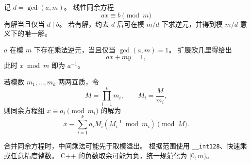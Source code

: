 记 $d=\gcd(a,m)$。
线性同余方程
\[
  ax\equiv b\pmod m
\]
有解当且仅当 $d\mid b$。
若有解，约去 $d$ 后可在模 $m/d$ 下求逆元，并得到模 $m/d$ 意义下的唯一解。

\begin{icpcresult}[逆元存在条件]
  $a$ 在模 $m$ 下存在乘法逆元，当且仅当 $\gcd(a,m)=1$。
  扩展欧几里得给出
  \[
    ax+my=1,
  \]
  此时 $x\bmod m$ 即为 $a^{-1}$。
\end{icpcresult}

若模数 $m_1,\ldots,m_k$ 两两互质，令
\[
  M=\prod_{i=1}^{k}m_i,\qquad M_i=\frac{M}{m_i},
\]
则同余方程组 $x\equiv a_i\pmod{m_i}$ 的解为
\[
  x\equiv \sum_{i=1}^{k}a_iM_i
  \left(M_i^{-1}\bmod m_i\right)\pmod M.
\]

\begin{icpcwarning}[实现细节]
  合并同余方程时，中间乘法可能先于取模溢出。
  根据范围使用 \texttt{\_\_int128}、快速乘或任意精度整数。
  C++ 的负数取余可能为负，统一规范化为 $[0,m)$。
\end{icpcwarning}
